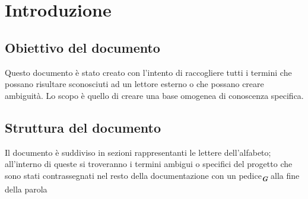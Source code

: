 


\section{Introduzione}

\subsection{Obiettivo del documento}
Questo documento è stato creato con l’intento di raccogliere tutti i termini che possano risultare sconosciuti ad un lettore esterno o che possano creare 
ambiguità. Lo scopo è quello di creare una base omogenea di conoscenza specifica.

\subsection{Struttura del documento}
Il documento è suddiviso in sezioni rappresentanti le lettere dell’alfabeto; all’interno di queste si troveranno i termini ambigui o specifici del progetto 
che sono stati contrassegnati nel resto della documentazione con un pedice\textsubscript{\textit{\textbf{G}}} alla fine della parola
